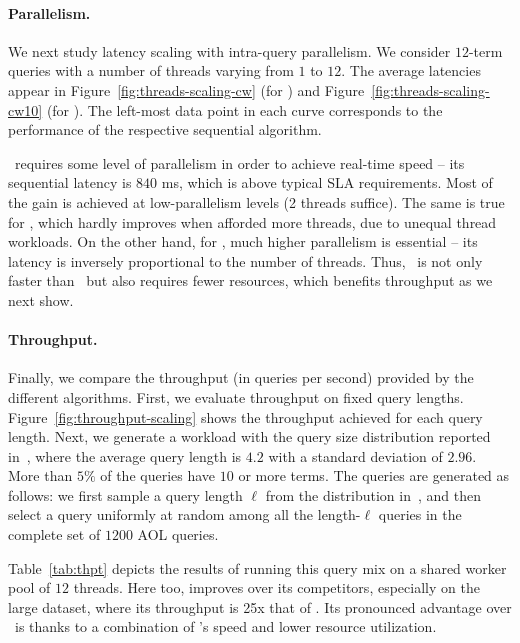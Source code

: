 {{\paragraph{Parallelism. } 
We next study latency scaling with  intra-query parallelism. 
We  consider  $12$-term queries with a number of threads varying from $1$ to $12$. 
The average latencies appear in Figure~\ref{fig:threads-scaling-cw}
(for \cw) and Figure~\ref{fig:threads-scaling-cw10} (for \cwten). 
The left-most data point in each curve corresponds to the performance of 
the respective sequential algorithm.

\alg\ requires some level of parallelism in order to achieve real-time speed -- its sequential latency is $840$ ms, which is  above typical SLA requirements. Most of the gain is achieved at low-parallelism levels (2 threads suffice). 
The same is true for \pJASS, which hardly improves when afforded more threads, due to unequal thread workloads.
On the other hand, for \pBMW, much higher parallelism is essential -- its latency is inversely proportional to the number of threads. Thus, \alg\ is not only faster 
than \pBMW\ but also requires fewer resources, which benefits throughput as we next show.


\paragraph{Throughput. } Finally, we compare the throughput (in queries per second) provided by the different
algorithms. First, we evaluate throughput on fixed query lengths.
Figure~\ref{fig:throughput-scaling} shows the throughput achieved for each query length.
Next, we generate a workload with the query size distribution reported in~\cite{sigir/Guy16},
where the average query length is $4.2$ with a standard deviation of $2.96$. More than $5\%$ of the queries have $10$ or more terms.
The queries are generated as follows: we first sample a query length $\ell$ from the distribution in~\cite{sigir/Guy16}, and then 
select a query uniformly at random among all the length-$\ell$ queries in the complete set of  $1200$ AOL queries. 

Table~\ref{tab:thpt} depicts the results of running this query mix on a shared worker pool  of $12$ threads.
Here too, \alg\/ improves over its competitors, especially on the large dataset, where its throughput is 25x that of \pBMW\hi. 
Its pronounced advantage over \pBMW\ is thanks to a combination of \alg's speed and lower resource utilization.


}}
